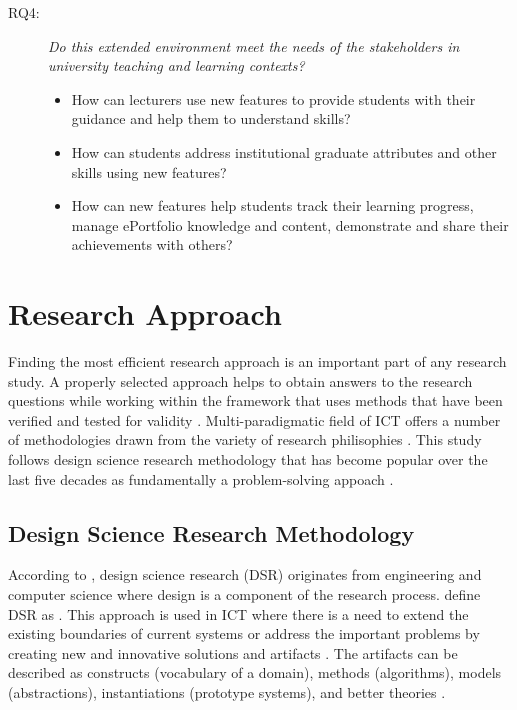 \begin{description}
	\item[RQ4:] \textit{Do this extended environment meet the needs of the
	stakeholders in university teaching and learning contexts?}
	\begin{itemize}
		\item How can lecturers use new features to provide students with their
guidance and help them to understand \LLLs skills?
		\item How can students address institutional graduate attributes and other
		skills using new features?
		\item How can new features help students track their learning progress, manage
ePortfolio knowledge and content, demonstrate and share their achievements
with others?
	\end{itemize}
\end{description}

\section{Research Approach}
\label{sec:method}

Finding the most efficient research approach is an important part of any
research study. A properly selected approach helps to obtain answers to the
research questions while working within the framework that uses methods that
have been verified and tested for validity \citep{Kumar2005}. Multi-paradigmatic
field of ICT offers a number of methodologies drawn from the variety of research
philisophies \citep{Vaishnavi2007}. This study follows design science research
methodology that has become popular over the last five decades as fundamentally
a problem-solving appoach \citep{Cross1993}.

\subsection{Design Science Research Methodology}

According to \citet{Peffers2008}, design science research (DSR) originates from
engineering and computer science where design is a component of the research
process. \citet{Iivari2009} define DSR as . This approach is used in ICT where there is a need to extend the
existing boundaries of current systems or address the important problems by
creating new and innovative solutions and artifacts \citep{Hevner2004}. The
artifacts can be described as constructs (vocabulary of a domain), methods
(algorithms), models (abstractions), instantiations (prototype systems), and
better theories \citep{Hevner2010}.

